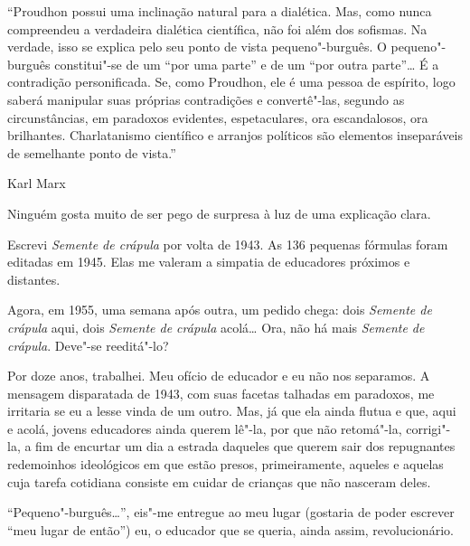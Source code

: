 \movetooddpage
\thispagestyle{empty}
\setcounter{footnote}{0}
\begin{vplace}[0.25]


{\large{}}
\end{vplace}

\pagebreak
\thispagestyle{empty}

\movetooddpage

``Proudhon possui uma inclinação natural para a dialética. Mas, como
nunca compreendeu a verdadeira dialética científica, não foi além dos
sofismas. Na verdade, isso se explica pelo seu ponto de vista
pequeno"-burguês. O pequeno"-burguês constitui"-se de um ``por uma parte''
e de um ``por outra parte''\ldots{} É a contradição personificada. Se, como
Proudhon, ele é uma pessoa de espírito, logo saberá manipular suas
próprias contradições e convertê"-las, segundo as circunstâncias, em
paradoxos evidentes, espetaculares, ora escandalosos, ora brilhantes.
Charlatanismo científico e arranjos políticos são elementos inseparáveis
de semelhante ponto de vista.''

Karl Marx

Ninguém gosta muito de ser pego de surpresa à luz de uma explicação
clara.

Escrevi \emph{Semente de crápula} por volta de 1943. As 136 pequenas
fórmulas foram editadas em 1945. Elas me valeram a simpatia de
educadores próximos e distantes.

Agora, em 1955, uma semana após outra, um pedido chega: dois
\emph{Semente de crápula} aqui, dois \emph{Semente de crápula}
acolá\ldots{} Ora, não há mais \emph{Semente de crápula}. Deve"-se
reeditá"-lo?

Por doze anos, trabalhei. Meu ofício de educador e eu não nos separamos.
A mensagem disparatada de 1943, com suas facetas talhadas em paradoxos,
me irritaria se eu a lesse vinda de um outro. Mas, já que ela ainda
flutua e que, aqui e acolá, jovens educadores ainda querem lê"-la, por
que não retomá"-la, corrigi"-la, a fim de encurtar um dia a estrada
daqueles que querem sair dos repugnantes redemoinhos ideológicos em que
estão presos, primeiramente, aqueles e aquelas cuja tarefa cotidiana
consiste em cuidar de crianças que não nasceram deles.

``Pequeno"-burguês\ldots{}'', eis"-me entregue ao meu lugar (gostaria de poder
escrever ``meu lugar de então'') eu, o educador que se queria, ainda
assim, revolucionário.


